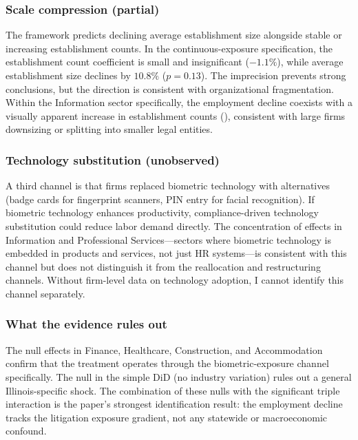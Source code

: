 \documentclass[12pt]{article}
\begin{document}
\subsubsection*{Scale compression (partial)} The framework predicts declining average establishment size alongside stable or increasing establishment counts. In the continuous-exposure specification, the establishment count coefficient is small and insignificant ($-1.1\%$), while average establishment size declines by $10.8\%$ ($p = 0.13$). The imprecision prevents strong conclusions, but the direction is consistent with organizational fragmentation. Within the Information sector specifically, the employment decline coexists with a visually apparent increase in establishment counts (), consistent with large firms downsizing or splitting into smaller legal entities.

\subsubsection*{Technology substitution (unobserved)} A third channel is that firms replaced biometric technology with alternatives (badge cards for fingerprint scanners, PIN entry for facial recognition). If biometric technology enhances productivity, compliance-driven technology substitution could reduce labor demand directly. The concentration of effects in Information and Professional Services---sectors where biometric technology is embedded in products and services, not just HR systems---is consistent with this channel but does not distinguish it from the reallocation and restructuring channels. Without firm-level data on technology adoption, I cannot identify this channel separately.

\subsubsection*{What the evidence rules out} The null effects in Finance, Healthcare, Construction, and Accommodation confirm that the treatment operates through the biometric-exposure channel specifically. The null in the simple DiD (no industry variation) rules out a general Illinois-specific shock. The combination of these nulls with the significant triple interaction is the paper's strongest identification result: the employment decline tracks the litigation exposure gradient, not any statewide or macroeconomic confound.
\end{document}
